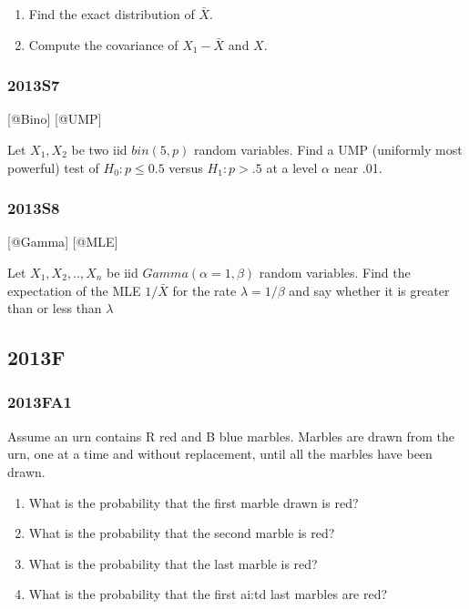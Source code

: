 \documentclass[6pt,twocolumn,Portrait]{article}
\begin{document}
\begin{enumerate}
\def\labelenumi{(\alph{enumi})}
\item
  Find the exact distribution of \(\bar X\).
\item
  Compute the covariance of \(X_1-\bar X\) and \(X\).
\end{enumerate}

\hypertarget{s7-2}{%
\subsubsection{2013S7}\label{s7-2}}

{[}@Bino{]} {[}@UMP{]}

Let \(X_1,X_2\) be two iid \(bin(5,p)\) random variables. Find a UMP
(uniformly most powerful) test of \(H_0: p\le 0.5\) versus \(H_1: p>.5\)
at a level \(\alpha\) near .01.

\hypertarget{s8-2}{%
\subsubsection{2013S8}\label{s8-2}}

{[}@Gamma{]} {[}@MLE{]}

Let \(X_1,X_2,..,X_{n}\) be iid \(Gamma(\alpha=1,\beta)\) random
variables. Find the expectation of the MLE \(1/\bar X\) for the rate
\(\lambda=1/\beta\) and say whether it is greater than or less than
\(\lambda\)

\hypertarget{f-8}{%
\subsection{2013F}\label{f-8}}

\hypertarget{fa1-2}{%
\subsubsection{2013FA1}\label{fa1-2}}

Assume an urn contains R red and B blue marbles. Marbles are drawn from
the urn, one at a time and without replacement, until all the marbles
have been drawn.

\begin{enumerate}
\def\labelenumi{(\alph{enumi})}
\item
  What is the probability that the first marble drawn is red?
\item
  What is the probability that the second marble is red?
\item
  What is the probability that the last marble is red?
\item
  What is the probability that the first ai:td last marbles are red?
\end{enumerate}
\end{document}
